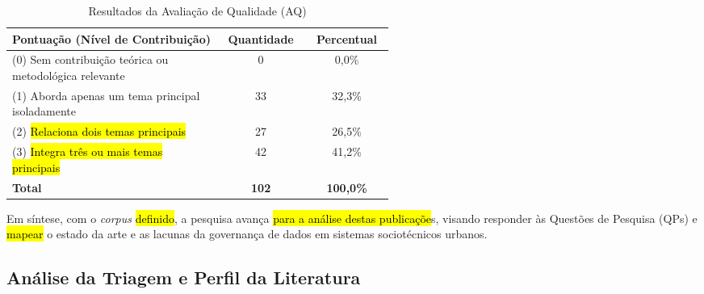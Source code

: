 \documentclass[12pt]{article}
\begin{document}
\begin{table}[H]
\centering
\caption{Resultados da Avaliação de Qualidade (AQ)}
\label{tab:resumo_qualidade}
\small
\begin{tabular}{p{0.55\linewidth} c c}
\hline
\textbf{Pontuação (Nível de Contribuição)} & \textbf{Quantidade} & \textbf{Percentual} \\
\hline
(0) Sem contribuição teórica ou metodológica relevante & 0 & 0,0\% \\
(1) Aborda apenas um tema principal isoladamente & 33 & 32,3\% \\
(2) \hl{Relaciona dois temas principais} & 27 & 26,5\% \\
(3) \hl{Integra três ou mais temas principais}  & 42 & 41,2\% \\
\hline
\textbf{Total} & \textbf{102} & \textbf{100,0\%} \\
\hline
\end{tabular}
\end{table}

Em síntese, com o \textit{corpus} \hl{definido}, a pesquisa avança \hl{para a análise destas publicaçõe}s, visando responder às Questões de Pesquisa (QPs) e \hl{mapear} o estado da arte e as lacunas da governança de dados em sistemas sociotécnicos urbanos.

\subsection{Análise da Triagem e Perfil da Literatura}


\end{document}
